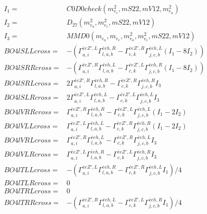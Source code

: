 \documentclass[A4,landscape]{article}
\begin{document}
\begin{align} 
I_1 = & C0D0check(m^2_{e_{{c}}}, mS22, mV12, m^2_{e_{{a}}}) \\ 
I_2 = & D_{27}(m^2_{e_{{a}}}, m^2_{e_{{c}}}, mS22, mV12) \\ 
I_3 = & MMD0(m_{e_{{a}}}, m_{e_{{c}}}, m^2_{e_{{a}}}, m^2_{e_{{c}}}, mS22, mV12) \\ 
  BO4lSLLcross= & -( \Gamma^{\bar{e}e {Z'} ,L}_{a, i} \Gamma^{\bar{e}e h ,R}_{l, a, b} - \Gamma^{\bar{e}e {Z'} ,R} _{c, k} \Gamma^{\bar{e}e h ,L}_{j, c, b} (I_1 - 8 I_2)) \\ 
  BO4lSRRcross= & -( \Gamma^{\bar{e}e {Z'} ,R}_{a, i} \Gamma^{\bar{e}e h ,L}_{l, a, b} - \Gamma^{\bar{e}e {Z'} ,L} _{c, k} \Gamma^{\bar{e}e h ,R}_{j, c, b} (I_1 - 8 I_2)) \\ 
  BO4lSRLcross= & 2  \Gamma^{\bar{e}e {Z'} ,R}_{a, i} \Gamma^{\bar{e}e h ,R}_{l, a, b} - \Gamma^{\bar{e}e {Z'} ,R} _{c, k} \Gamma^{\bar{e}e h ,R}_{j, c, b} I_3 \\ 
  BO4lSLRcross= & 2  \Gamma^{\bar{e}e {Z'} ,L}_{a, i} \Gamma^{\bar{e}e h ,L}_{l, a, b} - \Gamma^{\bar{e}e {Z'} ,L} _{c, k} \Gamma^{\bar{e}e h ,L}_{j, c, b} I_3 \\ 
  BO4lVRRcross= &  \Gamma^{\bar{e}e {Z'} ,R}_{a, i} \Gamma^{\bar{e}e h ,R}_{l, a, b} - \Gamma^{\bar{e}e {Z'} ,L} _{c, k} \Gamma^{\bar{e}e h ,L}_{j, c, b} (I_1 - 2 I_2) \\ 
  BO4lVLLcross= &  \Gamma^{\bar{e}e {Z'} ,L}_{a, i} \Gamma^{\bar{e}e h ,L}_{l, a, b} - \Gamma^{\bar{e}e {Z'} ,R} _{c, k} \Gamma^{\bar{e}e h ,R}_{j, c, b} (I_1 - 2 I_2) \\ 
  BO4lVRLcross= &  \Gamma^{\bar{e}e {Z'} ,R}_{a, i} \Gamma^{\bar{e}e h ,L}_{l, a, b} - \Gamma^{\bar{e}e {Z'} ,R} _{c, k} \Gamma^{\bar{e}e h ,L}_{j, c, b} I_3 \\ 
  BO4lVLRcross= &  \Gamma^{\bar{e}e {Z'} ,L}_{a, i} \Gamma^{\bar{e}e h ,R}_{l, a, b} - \Gamma^{\bar{e}e {Z'} ,L} _{c, k} \Gamma^{\bar{e}e h ,R}_{j, c, b} I_3 \\ 
  BO4lTLLcross= & -( \Gamma^{\bar{e}e {Z'} ,L}_{a, i} \Gamma^{\bar{e}e h ,R}_{l, a, b} - \Gamma^{\bar{e}e {Z'} ,R} _{c, k} \Gamma^{\bar{e}e h ,L}_{j, c, b} I_1)/4 \\ 
  BO4lTLRcross= & 0 \\ 
  BO4lTRLcross= & 0 \\ 
  BO4lTRRcross= & -( \Gamma^{\bar{e}e {Z'} ,R}_{a, i} \Gamma^{\bar{e}e h ,L}_{l, a, b} - \Gamma^{\bar{e}e {Z'} ,L} _{c, k} \Gamma^{\bar{e}e h ,R}_{j, c, b} I_1)/4 \\ 
\end{align} 
\end{document}
